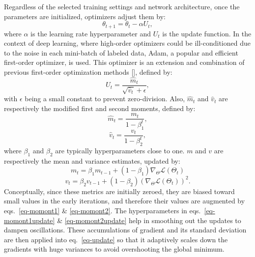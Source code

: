 \documentclass[12pt,a4paper]{report}
\begin{document}
Regardless of the selected training settings and network architecture, once the parameters are initialized, optimizers adjust them by:
%
\begin{equation}\label{eq-optimization}
\theta_{t+1} = \theta_t - \alpha U_t,
\end{equation}
%
where \(\alpha\) is the learning rate hyperparameter and \(U_t\) is the update function. In the context of deep learning, where high-order optimizers could be ill-conditioned due to the noise in each mini-batch of labeled data, Adam, a popular and efficient first-order optimizer, is used. This optimizer is an extension and combination of previous first-order optimization methods [\cite{kiefer1952, polyak1964, nesterov1983, duchi2011, hinton2012}], defined by:
%
\begin{equation}\label{eq-update}
U_t = \frac{\hat{m}_t}{\sqrt{\hat{v}_t} + \epsilon},
\end{equation}
%
with \(\epsilon\) being a small constant to prevent zero-division. Also, \(\hat{m}_t\) and \(\hat{v}_t\) are respectively the modified first and second moments, defined by:
%
\begin{equation}\label{eq-momont1}
\hat{m}_t = \frac{m_t}{1-\beta_1^t},
\end{equation}
%
\begin{equation}\label{eq-momont2}
\hat{v}_t = \frac{v_t}{1-\beta_2^t},
\end{equation}
%
where \(\beta_1\) and \(\beta_2\) are typically hyperparameters close to one. \(m\) and \(v\) are respectively the mean and variance estimates, updated by:
%
\begin{equation}\label{eq-momont1update}
{m}_t = \beta_1{m}_{t-1} + (1-\beta_1)\nabla_{\Theta} \mathcal{L}(\Theta_t)
\end{equation}
%
\begin{equation}\label{eq-momont2update}
{v}_t = \beta_2 {v}_{t-1} + (1-\beta_2)\left(\nabla_{\Theta} \mathcal{L}(\Theta_t)\right)^2.
\end{equation}
%
Conceptually, since these metrics are initially zeroed, they are biased toward small values in the early iterations, and therefore their values are augmented by eqs.~\ref{eq-momont1} \& \ref{eq-momont2}. The hyperparameters in eqs.~\ref{eq-momont1update} \& \ref{eq-momont2update} help in smoothing out the updates to dampen oscillations. These accumulations of gradient and its standard deviation are then applied into eq.~\ref{eq-update} so that it adaptively scales down the gradients with huge variances to avoid overshooting the global minimum.
\end{document}
